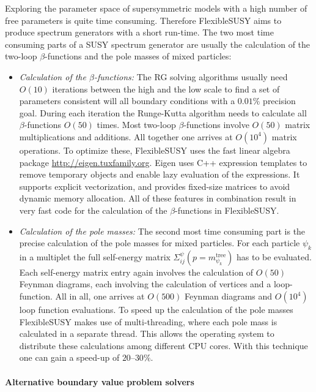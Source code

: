 \documentclass[final,3p,11pt,pdflatex]{elsarticle}
\makeatletter
\newcommand{\fs}{FlexibleSUSY\@\xspace}
\makeatother
\begin{document}
Exploring the parameter space of supersymmetric models with a high
number of free parameters is quite time consuming.  Therefore \fs aims
to produce spectrum generators with a short run-time.  The two most
time consuming parts of a SUSY spectrum generator are usually the
calculation of the two-loop $\beta$-functions and the pole masses of
mixed particles:
%
\begin{itemize}
\item \emph{Calculation of the $\beta$-functions:} The RG solving
  algorithms usually need $O(10)$ iterations between the high and the
  low scale to find a set of parameters consistent will all boundary
  conditions with a $0.01\%$ precision goal.  During each iteration
  the Runge-Kutta algorithm needs to calculate all $\beta$-functions
  $O(50)$ times.  Most two-loop $\beta$-functions involve $O(50)$
  matrix multiplications and additions.  All together one arrives at
  $O(10^4)$ matrix operations.  To optimize these, \fs uses the fast
  linear algebra package \href{Eigen}{http://eigen.tuxfamily.org}.
  Eigen uses C++ expression templates to remove temporary objects and
  enable lazy evaluation of the expressions.  It supports explicit
  vectorization, and provides fixed-size matrices to avoid dynamic
  memory allocation.  All of these features in combination result in
  very fast code for the calculation of the $\beta$-functions in \fs.
%
\item \emph{Calculation of the pole masses:} The second most time
  consuming part is the precise calculation of the pole masses for
  mixed particles.  For each particle $\psi_k$ in a multiplet the full
  self-energy matrix $\Sigma^\psi_{ij}(p=m^\text{tree}_{\psi_k})$ has
  to be evaluated.  Each self-energy matrix entry again involves the
  calculation of $O(50)$ Feynman diagrams, each involving the
  calculation of vertices and a loop-function.  All in all, one
  arrives at $O(500)$ Feynman diagrams and $O(10^4)$ loop function
  evaluations.  To speed up the calculation of the pole masses \fs
  makes use of multi-threading, where each pole mass is calculated in
  a separate thread.  This allows the operating system to distribute
  these calculations among different CPU cores.  With this technique
  one can gain a speed-up of $20$--$30\%$.
\end{itemize}

\paragraph{Alternative boundary value problem solvers}
\end{document}
